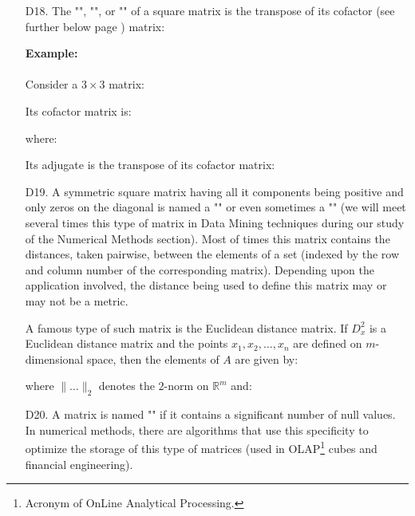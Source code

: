 \begin{enumerate}
		\item[D18.] The "\label{adjugate}", "", or "" of a square matrix is the transpose of its cofactor (see further below page \pageref{cofactor}) matrix:
		
		
		\begin{tcolorbox}[colframe=black,colback=white,sharp corners]
		\textbf{{\Large {}}Example:}\\\\
		Consider a $3\times 3$ matrix:
		
		Its cofactor matrix is:
		
		where:
		
		Its adjugate is the transpose of its cofactor matrix:
		
		\end{tcolorbox}
			
		\item[D19.] A symmetric square matrix having all it components being positive and only zeros on the diagonal is named a "\label{distance matrix}" or even sometimes a "" (we will meet several times this type of matrix in Data Mining techniques during our study of the Numerical Methods section). Most of times this matrix contains the distances, taken pairwise, between the elements of a set (indexed by the row and column number of the corresponding matrix). Depending upon the application involved, the distance being used to define this matrix may or may not be a metric.
		
		A famous type of such matrix is the Euclidean distance matrix. If $D_x^2$ is a Euclidean distance matrix and the points $x_{1},x_{2},\ldots ,x_{n}$ are defined on $m$-dimensional space, then the elements of $A$ are given by:
	
	where $\lVert \ldots \rVert _{2}$ denotes the $2$-norm on $\mathbb{R}^m$ and:
	

		
		\item[D20.] A matrix is named "" if it contains a significant number of null values. In numerical methods, there are algorithms that use this specificity to optimize the storage of this type of matrices (used in OLAP\footnote{Acronym of OnLine Analytical Processing.} cubes and financial engineering).
		

\end{enumerate}
